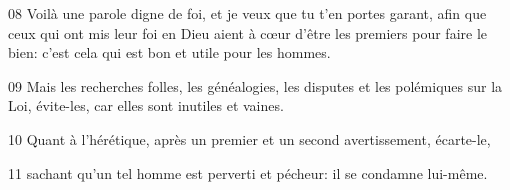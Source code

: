 
08 Voilà une parole digne de foi, et je veux que tu t’en portes garant, afin que ceux qui ont mis leur foi en Dieu aient à cœur d’être les premiers pour faire le bien: c’est cela qui est bon et utile pour les hommes.

09 Mais les recherches folles, les généalogies, les disputes et les polémiques sur la Loi, évite-les, car elles sont inutiles et vaines.

10 Quant à l’hérétique, après un premier et un second avertissement, écarte-le,

11 sachant qu’un tel homme est perverti et pécheur: il se condamne lui-même.